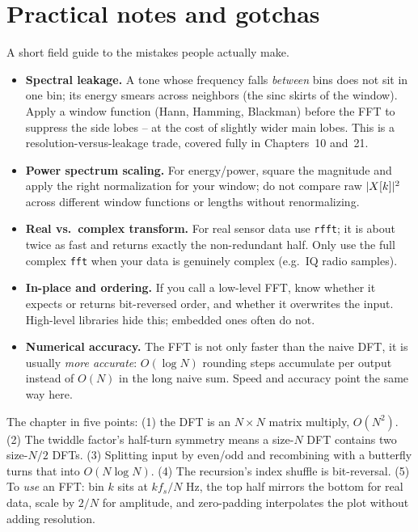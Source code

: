 \section{Practical notes and gotchas}
\label{ch09:practical}

A short field guide to the mistakes people actually make.

\begin{itemize}
\item \textbf{Spectral leakage.} A tone whose frequency falls \emph{between} bins does
not sit in one bin; its energy smears across neighbors (the sinc skirts of the window).
Apply a window function (Hann, Hamming, Blackman) before the FFT to suppress the side
lobes -- at the cost of slightly wider main lobes. This is a resolution-versus-leakage
trade, covered fully in Chapters~10 and~21.
\item \textbf{Power spectrum scaling.} For energy/power, square the magnitude and apply
the right normalization for your window; do not compare raw $\lvert X[k]\rvert^2$ across
different window functions or lengths without renormalizing.
\item \textbf{Real vs.\ complex transform.} For real sensor data use \texttt{rfft}; it is
about twice as fast and returns exactly the non-redundant half. Only use the full complex
\texttt{fft} when your data is genuinely complex (e.g.\ IQ radio samples).
\item \textbf{In-place and ordering.} If you call a low-level FFT, know whether it expects
or returns bit-reversed order, and whether it overwrites the input. High-level libraries
hide this; embedded ones often do not.
\item \textbf{Numerical accuracy.} The FFT is not only faster than the naive DFT, it is
usually \emph{more accurate}: $O(\log N)$ rounding steps accumulate per output instead of
$O(N)$ in the long naive sum. Speed and accuracy point the same way here.
\end{itemize}

\begin{recoverybox}
The chapter in five points: (1) the DFT is an $N\times N$ matrix multiply, $O(N^2)$.
(2) The twiddle factor's half-turn symmetry means a size-$N$ DFT contains two size-$N/2$
DFTs. (3) Splitting input by even/odd and recombining with a butterfly turns that into
$O(N\log N)$. (4) The recursion's index shuffle is bit-reversal. (5) To \emph{use} an
FFT: bin $k$ sits at $kf_s/N$ Hz, the top half mirrors the bottom for real data, scale by
$2/N$ for amplitude, and zero-padding interpolates the plot without adding resolution.
\end{recoverybox}

